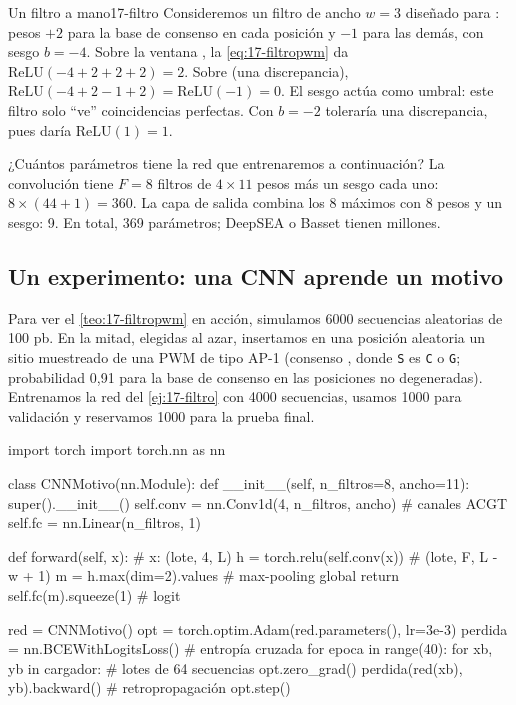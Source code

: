 \begin{ejemplo}{Un filtro a mano}{17-filtro}
Consideremos un filtro de ancho $w=3$ diseñado para : pesos $+2$ para la base de consenso en cada posición y $-1$ para las demás, con sesgo $b=-4$. Sobre la ventana , la \cref{eq:17-filtropwm} da $\mathrm{ReLU}(-4+2+2+2)=2$. Sobre  (una discrepancia), $\mathrm{ReLU}(-4+2-1+2)=\mathrm{ReLU}(-1)=0$. El sesgo actúa como umbral: este filtro solo ``ve'' coincidencias perfectas. Con $b=-2$ toleraría una discrepancia, pues  daría $\mathrm{ReLU}(1)=1$.

¿Cuántos parámetros tiene la red que entrenaremos a continuación? La convolución tiene $F=8$ filtros de $4\times11$ pesos más un sesgo cada uno: $8\times(44+1)=360$. La capa de salida combina los 8 máximos con 8 pesos y un sesgo: 9. En total, 369 parámetros; DeepSEA o Basset tienen millones.
\end{ejemplo}

\subsection{Un experimento: una CNN aprende un motivo}

Para ver el \cref{teo:17-filtropwm} en acción, simulamos \num{6000} secuencias aleatorias de 100 pb. En la mitad, elegidas al azar, insertamos en una posición aleatoria un sitio muestreado de una PWM de tipo AP-1 (consenso , donde \texttt{S} es \texttt{C} o \texttt{G}; probabilidad 0,91 para la base de consenso en las posiciones no degeneradas). Entrenamos la red del \cref{ej:17-filtro} con \num{4000} secuencias, usamos \num{1000} para validación y reservamos \num{1000} para la prueba final.

\begin{codigo}
import torch
import torch.nn as nn

class CNNMotivo(nn.Module):
    def __init__(self, n_filtros=8, ancho=11):
        super().__init__()
        self.conv = nn.Conv1d(4, n_filtros, ancho)  # canales ACGT
        self.fc = nn.Linear(n_filtros, 1)

    def forward(self, x):                   # x: (lote, 4, L)
        h = torch.relu(self.conv(x))        # (lote, F, L - w + 1)
        m = h.max(dim=2).values             # max-pooling global
        return self.fc(m).squeeze(1)        # logit

red = CNNMotivo()
opt = torch.optim.Adam(red.parameters(), lr=3e-3)
perdida = nn.BCEWithLogitsLoss()            # entropía cruzada
for epoca in range(40):
    for xb, yb in cargador:                 # lotes de 64 secuencias
        opt.zero_grad()
        perdida(red(xb), yb).backward()     # retropropagación
        opt.step()
\end{codigo}

